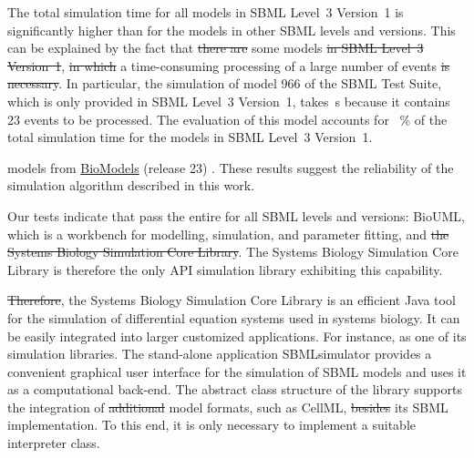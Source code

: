 \documentclass[10pt]{bmc_article}
\newenvironment{bmcformat}{\fussy\setboolean{publ}{true}}{\fussy}
\begin{document}
\begin{bmcformat}
{The total simulation time for all models in \acs{SBML} Level~3 Version~1 is significantly
higher than for the models in other \acs{SBML} levels and versions.
This can be explained by the fact that \sout{there are}
some models \sout{in \acs{SBML} Level~3 Version~1}, 
\sout{in which} 
a time-consuming processing of a large number of events\sout{ is necessary}.
In particular, the simulation of model \COR{\numero~}966 of the SBML Test Suite,
which is only provided in \acs{SBML} Level~3 Version~1, takes \,s because it contains 23 events to be processed.
The evaluation of this model accounts for ~\% of the total simulation time for the models in \acs{SBML} Level~3 Version~1.
 
models from \href{http://biomodels.net}{BioModels}  (release 23)
.
These results suggest the reliability of the simulation algorithm described in
this work.

Our tests indicate that  pass the entire  for all 
\acs{SBML} levels and versions: BioUML, which is a workbench for modelling, simulation,
and parameter fitting, and \sout{the Systems Biology Simulation Core Library}.
The Systems Biology Simulation Core Library is therefore the only \acs{API} simulation
library exhibiting this capability.

\sout{Therefore}, the Systems Biology Simulation Core Library is an efficient Java tool
for the simulation of differential equation systems used in systems biology.
It can be easily integrated into larger customized applications.
For instance, 
as one of its  simulation libraries.
The stand-alone application SBMLsimulator 
provides a convenient graphical user interface for the simulation of \acs{SBML}
models and uses it as a computational back-end.
The abstract class structure of the library supports the integration of \sout{additional} model formats,
such as CellML, \sout{besides} its \acs{SBML} implementation.
To this end, it is only necessary to implement a suitable interpreter class.


}
\end{bmcformat}
\end{document}
